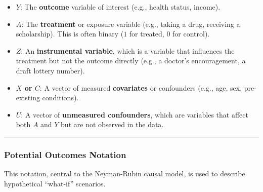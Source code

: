 \documentclass[
  letterpaper,
  DIV=11,
  numbers=noendperiod]{scrartcl}
\providecommand{\tightlist}{%
  \setlength{\itemsep}{0pt}\setlength{\parskip}{0pt}}
\begin{document}
\begin{itemize}
\tightlist
\item
  \textbf{\(Y\)}: The \textbf{outcome} variable of interest (e.g.,
  health status, income).
\item
  \textbf{\(A\)}: The \textbf{treatment} or exposure variable (e.g.,
  taking a drug, receiving a scholarship). This is often binary (\(1\)
  for treated, \(0\) for control).
\item
  \textbf{\(Z\)}: An \textbf{instrumental variable}, which is a variable
  that influences the treatment but not the outcome directly (e.g., a
  doctor's encouragement, a draft lottery number).
\item
  \textbf{\(X\) or \(C\)}: A vector of measured \textbf{covariates} or
  confounders (e.g., age, sex, pre-existing conditions).
\item
  \textbf{\(U\)}: A vector of \textbf{unmeasured confounders}, which are
  variables that affect both \(A\) and \(Y\) but are not observed in the
  data.
\end{itemize}

\begin{center}\rule{0.5\linewidth}{0.5pt}\end{center}

\subsubsection{Potential Outcomes
Notation}\label{potential-outcomes-notation}

This notation, central to the Neyman-Rubin causal model, is used to
describe hypothetical ``what-if'' scenarios.
\end{document}
